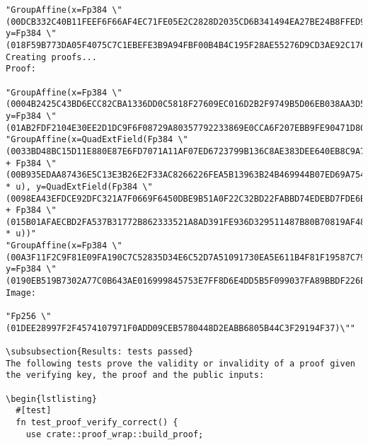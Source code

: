 \documentclass{article}
\begin{document}
\begin{lstlisting}
"GroupAffine(x=Fp384 \"(00DCB332C40B11FEEF6F66AF4EC71FE05E2C2828D2035CD6B341494EA27BE24B8FFED97FBED4F77DF823A871D12BD71D)\", y=Fp384 \"(018F59B773DA05F4075C7C1EBEFE3B9A94FBF00B4B4C195F28AE55276D9CD3AE92C17672E8B10E504387202599F16CB2)\")"
Creating proofs...
Proof:

"GroupAffine(x=Fp384 \"(0004B2425C43BD6ECC82CBA1336DD0C5818F27609EC016D2B2F9749B5D06EB038AA3D54CEF0532B301A3CC7B71553914)\", y=Fp384 \"(01AB2FDF2104E30EE2D1DC9F6F08729A80357792233869E0CCA6F207EBB9FE90471D80E1769337B279568C548EBE4DFD)\")"
"GroupAffine(x=QuadExtField(Fp384 \"(0033BD48BC15D11E880E87E6FD7071A11AF07ED6723799B136C8AE383DEE640EB8C9A70D269CE7485285FED7B521D2B7)\" + Fp384 \"(00B935EDAA87436E5C13E3B26E2F33AC8266226FEA5B13963B24B469944B07ED69A754B53FF0F52C4CFCD1C674A08531)\" * u), y=QuadExtField(Fp384 \"(0098EA43EFDCE92DFC321A7F0669F6450DBE9B51A0F22C32BD22FABBD74EDEBD7FDE6B56A672EFDE149BBE09249BEB22)\" + Fp384 \"(015B01AFAECBD2FA537B31772B862333521A8AD391FE936D329511487B80B70819AF48667C13537F345713F8DF16233D)\" * u))"
"GroupAffine(x=Fp384 \"(00A3F11F2C9F81E09FA190C7C52835D34E6C52D7A51091730EA5E611B4F81F19587C7962F87EAA6E53030AFFD75612EF)\", y=Fp384 \"(0190EB519B7302A77C0B643AE016999845753E7FF8D6E4DD5B5F099037FA89BBDF226E0F9EABB3A0C66785A25519B7BE)\")"
Image:

"Fp256 \"(01DEE28997F2F4574107971F0ADD09CEB5780448D2EABB6805B44C3F29194F37)\""

\subsubsection{Results: tests passed}
The following tests prove the validity or invalidity of a proof given the verifying key, the proof and the public inputs:

\begin{lstlisting}
  #[test]
  fn test_proof_verify_correct() {
    use crate::proof_wrap::build_proof;


\end{lstlisting}
\end{document}
